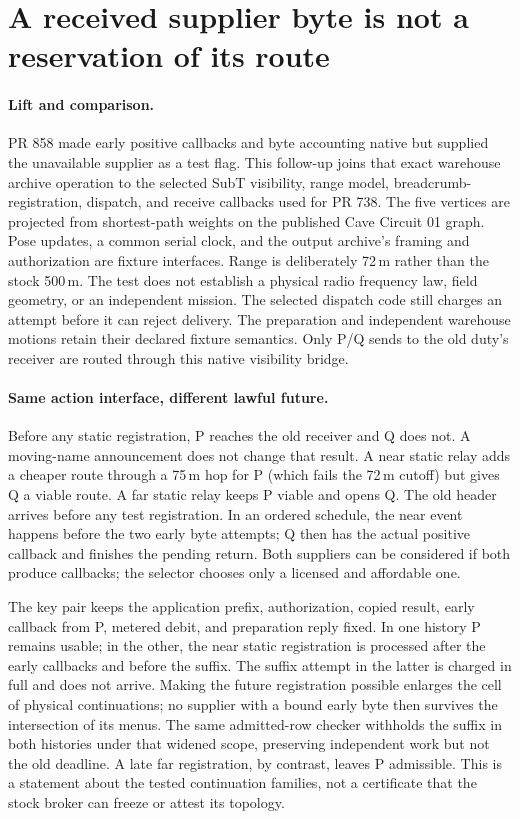 \documentclass{article}
\begin{document}
\section*{A received supplier byte is not a reservation of its route}
\paragraph{Lift and comparison.}
PR 858 made early positive callbacks and byte accounting native but supplied
the unavailable supplier as a test flag. This follow-up joins that exact
warehouse archive operation to the selected SubT visibility, range model,
breadcrumb-registration, dispatch, and receive callbacks used for PR 738.
The five vertices are projected from shortest-path weights on the published
Cave Circuit 01 graph. Pose updates, a common serial clock, and the output
archive's framing and authorization are fixture interfaces. Range is
deliberately 72\,m rather than the stock 500\,m. The test does not establish
a physical radio frequency law, field geometry, or an independent mission.
The selected dispatch code still charges an attempt before it can reject
delivery. The preparation and independent warehouse motions retain their
declared fixture semantics. Only P/Q sends to the old duty's receiver are
routed through this native visibility bridge.

\paragraph{Same action interface, different lawful future.}
Before any static registration, P reaches the old receiver and Q does not.
A moving-name announcement does not change that result. A near static relay
adds a cheaper route through a 75\,m hop for P (which fails the 72\,m cutoff)
but gives Q a viable route. A far static relay keeps P viable and opens Q.
The old header arrives before any test registration. In an ordered
schedule, the near event happens before the two early byte attempts;
Q then has the actual positive callback and finishes the pending return.
Both suppliers can be considered if both produce callbacks; the selector
chooses only a licensed and affordable one.

The key pair keeps the application prefix, authorization, copied result,
early callback from P, metered debit, and preparation reply fixed. In one
history P remains usable; in the other, the near static registration is
processed after the early callbacks and before the suffix. The suffix
attempt in the latter is charged in full and does not arrive. Making the
future registration possible enlarges the cell of physical continuations;
no supplier with a bound early byte then survives the intersection of its
menus. The same admitted-row checker withholds the suffix in both histories
under that widened scope, preserving independent work but not the old
deadline. A late far registration, by contrast, leaves P admissible.
This is a statement about the tested continuation families, not a
certificate that the stock broker can freeze or attest its topology.
\end{document}
